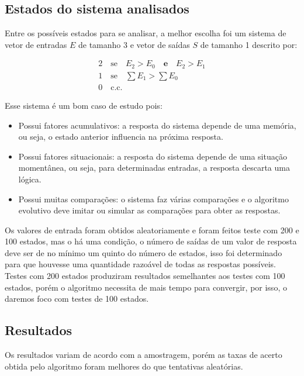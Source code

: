\subsection{Estados do sistema analisados}

Entre os possíveis estados para se analisar, a melhor escolha foi um sistema de vetor de entradas $E$ de tamanho 3 e vetor de saídas $S$ de tamanho 1 descrito por:

\begin{gather*}
    2 \quad \mathrm{se} \quad E_2 > E_0 \quad \mathbf{e} \quad E_2 > E_1 \\
    1 \quad \mathrm{se} \quad \sum E_1 > \sum E_0 \\
    0 \quad \mathrm{c.c.}
\end{gather*}

Esse sistema é um bom caso de estudo pois:

\begin{itemize}
    \item Possui fatores acumulativos: a resposta do sistema depende de uma memória, ou seja, o estado anterior influencia na próxima resposta.
    \item Possui fatores situacionais: a resposta do sistema depende de uma situação momentânea, ou seja, para determinadas entradas, a resposta descarta uma lógica.
    \item Possui muitas comparações: o sistema faz várias comparações e o algoritmo evolutivo deve imitar ou simular as comparações para obter as respostas.
\end{itemize}

Os valores de entrada foram obtidos aleatoriamente e foram feitos teste com 200 e 100 estados, mas o há uma condição, o número de saídas de um valor de resposta deve ser de no mínimo um quinto do número de estados, isso foi determinado para que houvesse uma quantidade razoável de todas as respostas possíveis. Testes com 200 estados produziram resultados semelhantes aos testes com 100 estados, porém o algoritmo necessita de mais tempo para convergir, por isso, o daremos foco com testes de 100 estados.

\subsection{Resultados}

Os resultados variam de acordo com a amostragem, porém as taxas de acerto obtida pelo algoritmo foram melhores do que tentativas aleatórias.


